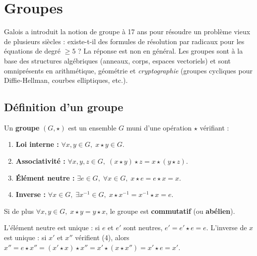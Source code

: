 \chapter{Groupes}

\begin{intuitionbox}
Galois a introduit la notion de groupe à 17 ans pour résoudre un problème vieux de plusieurs siècles : existe-t-il des formules de résolution par radicaux pour les équations de degré $\geqslant 5$ ? La réponse est non en général. Les groupes sont à la base des structures algébriques (anneaux, corps, espaces vectoriels) et sont omniprésents en arithmétique, géométrie et \emph{cryptographie} (groupes cycliques pour Diffie-Hellman, courbes elliptiques, etc.).
\end{intuitionbox}


\section{Définition d'un groupe}

\begin{defbox}[--- Groupe]
Un \textbf{groupe} $(G, \star)$ est un ensemble $G$ muni d'une opération $\star$ vérifiant :
\begin{enumerate}[leftmargin=1cm]
  \item \textbf{Loi interne :} $\forall x, y \in G, \; x \star y \in G$.
  \item \textbf{Associativité :} $\forall x, y, z \in G, \; (x \star y) \star z = x \star (y \star z)$.
  \item \textbf{Élément neutre :} $\exists e \in G, \; \forall x \in G, \; x \star e = e \star x = x$.
  \item \textbf{Inverse :} $\forall x \in G, \; \exists x^{-1} \in G, \; x \star x^{-1} = x^{-1} \star x = e$.
\end{enumerate}
Si de plus $\forall x, y \in G, \; x \star y = y \star x$, le groupe est \textbf{commutatif} (ou \textbf{abélien}).
\end{defbox}

\begin{rembox}[Unicité]
L'élément neutre est unique : si $e$ et $e'$ sont neutres, $e' = e' \star e = e$. L'inverse de $x$ est unique : si $x'$ et $x''$ vérifient (4), alors $x'' = e \star x'' = (x' \star x) \star x'' = x' \star (x \star x'') = x' \star e = x'$.
\end{rembox}

